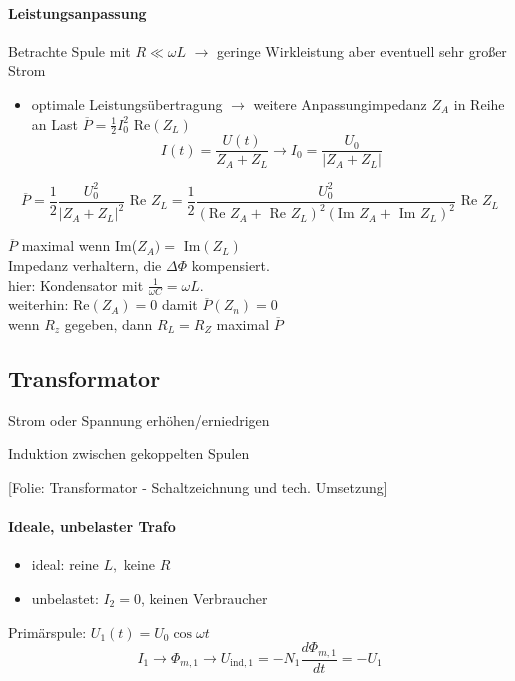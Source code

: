 \documentclass[titlepage,12pt,a4paper,ngerman]{report}
\newcommand{\tx}[1]{\textrm{#1}}
\newcommand{\folie}[1]{\color{gray}[Folie: #1]\color{black}}
\begin{document}
\paragraph{Leistungsanpassung}
Betrachte Spule mit $R\ll \omega L$ $\rightarrow$ geringe Wirkleistung aber eventuell sehr großer Strom
\begin{itemize}
	\item optimale Leistungsübertragung $\rightarrow$ weitere Anpassungimpedanz $Z_A$ in Reihe an Last $\overline P = \frac{1}{2} I^2_0 \tx{ Re}(Z_L)$
	$$I(t) = \frac{U(t)}{Z_A + Z_L} \rightarrow I_0 = \frac{U_0}{|Z_A + Z_L|}$$
\end{itemize}
$$ \overline{P} = \frac{1}{2} \frac{U_0^2}{|Z_A + Z_L|^2} \tx{ Re } Z_L = \frac{1}{2} \frac{U_0^2}{(\tx{Re } Z_A + \tx{ Re } Z_L)^2 (\tx{Im } Z_A + \tx{ Im } Z_L)^2 } \tx{ Re } Z_L $$

	$\overline P$ maximal wenn Im($Z_A) = $ Im$(Z_L)$\\ Impedanz verhaltern,  die $ \Delta \Phi $ kompensiert.\\
hier: Kondensator mit $ \frac{1}{\omega C} = \omega L $.\\
weiterhin: $ \tx{Re}(Z_A) = 0 $ damit $ \overline{P}(Z_n) = 0 $\\
wenn $ R_z $ gegeben, dann $ R_L = R_Z $ maximal $ \overline{P} $ 
\subsection{Transformator}
\begin{description}
	\item [Ziel] Strom oder Spannung erhöhen/erniedrigen
	\item [Prinzip] Induktion zwischen gekoppelten Spulen
	\item \folie{Transformator - Schaltzeichnung und tech. Umsetzung}
\end{description}
\paragraph{Ideale, unbelaster Trafo}
 \begin{itemize}
 	\item ideal: reine $L,$ keine $R$
 	\item unbelastet: $I_2 = 0$, keinen Verbraucher
 \end{itemize}
Primärspule: $U_1(t) = U_0 \cos \omega t$
$$I_1 \rightarrow \Phi_{m,1} \rightarrow U_{\tx{ind},1} = - N_1 \frac{d \Phi_{m,1}}{dt}= - U_1$$
\end{document}
